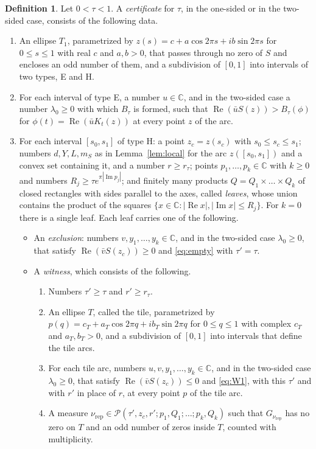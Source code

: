 \documentclass[11pt]{amsart}
\theoremstyle{definition}
\newtheorem{definition}[theorem]{Definition}
\theoremstyle{remark}
\numberwithin{equation}{section}
\newcommand{\C}{\mathbb{C}}
\newcommand{\re}{\operatorname{Re}}
\newcommand{\im}{\operatorname{Im}}
\begin{document}
\begin{definition}\label{def:cert}
Let $0<\tau<1$. A \emph{certificate} for $\tau$, in the one-sided or in the two-sided case, consists of the following data.
\begin{enumerate}[label=(\roman*)]
\item\label{c:T1} An ellipse $T_1$, parametrized by $z(s)=c+a\cos2\pi s+ib\sin2\pi s$ for $0\le s\le1$ with real $c$ and $a,b>0$, that passes through no zero of $S$ and encloses an odd number of them, and a subdivision of $[0,1]$ into intervals of two types, E and H.
\item\label{c:E} For each interval of type E, a number $u\in\C$, and in the two-sided case a number $\lambda_0\ge0$ with which $B_\tau$ is formed, such that $\re(\bar uS(z))>B_\tau(\phi)$ for $\phi(t)=\re(\bar uK_t(z))$ at every point $z$ of the arc.
\item\label{c:H} For each interval $[s_0,s_1]$ of type H: a point $z_c=z(s_c)$ with $s_0\le s_c\le s_1$; numbers $d,Y,L,m_S$ as in Lemma~\ref{lem:local} for the arc $z([s_0,s_1])$ and a convex set containing it, and a number $r\ge r_\tau$; points $p_1,\dots,p_k\in\C$ with $k\ge0$ and numbers $R_j\ge\tau e^{\pi|\im p_j|}$; and finitely many products $Q=Q_1\times\dots\times Q_k$ of closed rectangles with sides parallel to the axes, called \emph{leaves}, whose union contains the product of the squares $\{x\in\C:|\re x|,|\im x|\le R_j\}$. For $k=0$ there is a single leaf. Each leaf carries one of the following.
\begin{itemize}
\item An \emph{exclusion}: numbers $v,y_1,\dots,y_k\in\C$, and in the two-sided case $\lambda_0\ge0$, that satisfy $\re(\bar vS(z_c))\ge0$ and \eqref{eq:empty} with $\tau'=\tau$.
\item A \emph{witness}, which consists of the following.
\begin{enumerate}[label=(\alph*)]
\item Numbers $\tau'\ge\tau$ and $r'\ge r_\tau$.
\item An ellipse $T$, called the tile, parametrized by $p(q)=c_T+a_T\cos2\pi q+ib_T\sin2\pi q$ for $0\le q\le1$ with complex $c_T$ and $a_T,b_T>0$, and a subdivision of $[0,1]$ into intervals that define the tile arcs.
\item For each tile arc, numbers $u,v,y_1,\dots,y_k\in\C$, and in the two-sided case $\lambda_0\ge0$, that satisfy $\re(\bar vS(z_c))\le0$ and \eqref{eq:W1}, with this $\tau'$ and with $r'$ in place of $r$, at every point $p$ of the tile arc.
\item A measure $\nu_{\mathrm{rep}}\in\mathcal P(\tau',z_c,r';p_1,Q_1;\dots;p_k,Q_k)$ such that $G_{\nu_{\mathrm{rep}}}$ has no zero on $T$ and an odd number of zeros inside $T$, counted with multiplicity.
\end{enumerate}
\end{itemize}
\end{enumerate}
\end{definition}
\end{document}

